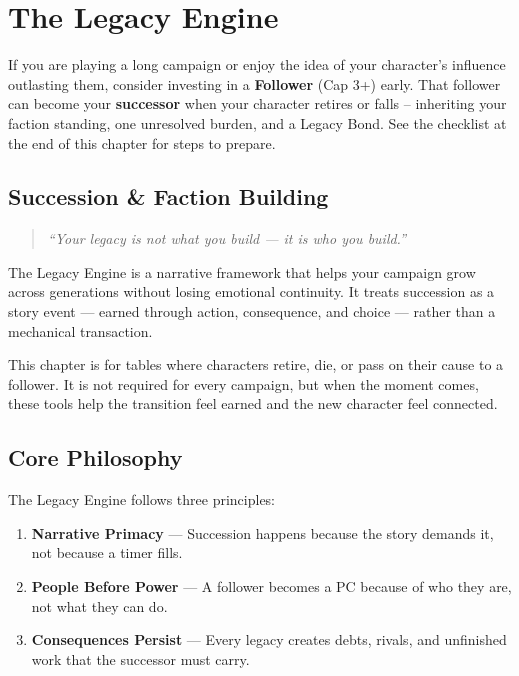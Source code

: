 \chapter{The Legacy Engine}
\label{ch:legacy-engine}

\begin{tcolorbox}[colback=blue!5!white,colframe=blue!75!black,title=Planning for Legacy,breakable]
If you are playing a long campaign or enjoy the idea of your character's influence outlasting them, consider investing in a \textbf{Follower} (Cap 3+) early. That follower can become your \textbf{successor} when your character retires or falls -- inheriting your faction standing, one unresolved burden, and a Legacy Bond. See the checklist at the end of this chapter for steps to prepare.
\end{tcolorbox}

\section*{Succession \& Faction Building}

\begin{quote}
\emph{``Your legacy is not what you build --- it is who you build.''}
\end{quote}

The Legacy Engine is a narrative framework that helps your campaign grow across generations without losing emotional continuity. It treats succession as a story event --- earned through action, consequence, and choice --- rather than a mechanical transaction.

This chapter is for tables where characters retire, die, or pass on their cause to a follower. It is not required for every campaign, but when the moment comes, these tools help the transition feel earned and the new character feel connected.

\section{Core Philosophy}
\label{sec:legacy-philosophy}

The Legacy Engine follows three principles:

\begin{enumerate}
  \item \textbf{Narrative Primacy} --- Succession happens because the story demands it, not because a timer fills.
  \item \textbf{People Before Power} --- A follower becomes a PC because of who they are, not what they can do.
  \item \textbf{Consequences Persist} --- Every legacy creates debts, rivals, and unfinished work that the successor must carry.
\end{enumerate}


